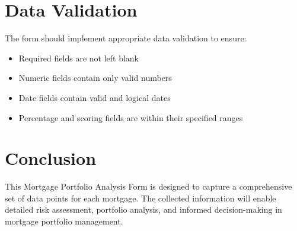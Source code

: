 \documentclass[12pt,a4paper]{article}
\begin{document}
\section{Data Validation}
The form should implement appropriate data validation to ensure:
\begin{itemize}
  \item Required fields are not left blank
  \item Numeric fields contain only valid numbers
  \item Date fields contain valid and logical dates
  \item Percentage and scoring fields are within their specified ranges
\end{itemize}

\section{Conclusion}
This Mortgage Portfolio Analysis Form is designed to capture a comprehensive set of data points for each mortgage. The collected information will enable detailed risk assessment, portfolio analysis, and informed decision-making in mortgage portfolio management.
\end{document}
